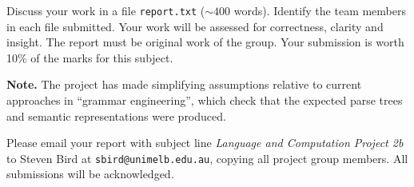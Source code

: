 \documentclass[a4paper,11pt]{article}
\begin{document}
Discuss your work in a file \verb|report.txt| ($\sim 400$ words).
Identify the team members in each file submitted.
Your work will be assessed for correctness, clarity and insight. 
The report must be original work of the group.
Your submission is worth 10\% of the marks for this subject.

\textbf{Note.}  The project has made simplifying assumptions
relative to current approaches in ``grammar engineering'',
which check that the expected parse trees and semantic
representations were produced.

Please email your report with subject line
\textit{Language and Computation Project 2b}
to Steven Bird at \texttt{sbird@unimelb.edu.au},
copying all project group members.  All submissions
will be acknowledged.
\end{document}
